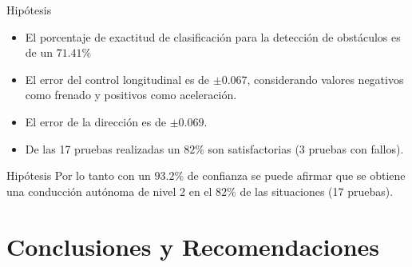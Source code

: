 \documentclass[10pt, usepdftitle=false]{beamer}
\begin{document}

\begin{frame}[fragile]{Hipótesis}
	\begin{itemize}[<+-|alert@+>]
		\item El porcentaje de exactitud de clasificación para la detección de obstáculos es de un $71.41\%$
		\item El error del control longitudinal es de $\pm 0.067$, considerando valores negativos como frenado y positivos como aceleración.
		\item El error de la dirección es de $\pm0.069$.
		\item De las 17 pruebas realizadas un $82\%$ son satisfactorias (3 pruebas con fallos).
	\end{itemize}
\end{frame}

\begin{frame}[fragile]{Hipótesis}
	Por lo tanto con un $93.2\%$ de confianza se puede afirmar que se obtiene una conducción autónoma de nivel 2 en el $82\%$ de las situaciones (17 pruebas).
\end{frame}

\section[CONCLUSIONES Y RECOMENDACIONES]{Conclusiones y Recomendaciones}
\end{document}
